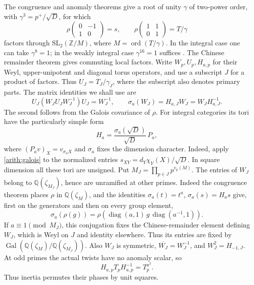 \documentclass[11pt,a4paper]{article}
\numberwithin{equation}{section}
\begin{document}
The congruence and anomaly theorems give a root of unity $\gamma$ of
two-power order, with $\gamma^3=p^+/\sqrt D$, for which
\[
 \rho\!\begin{pmatrix}0&-1\\1&0\end{pmatrix}=s,
 \qquad
 \rho\!\begin{pmatrix}1&1\\0&1\end{pmatrix}=T/\gamma
\]
factors through $\mathrm{SL}_2(\mathbb Z/M)$, where
$M=\operatorname{ord}(T/\gamma)$. In the integral case one can take
$\gamma^8=1$; in the weakly integral case $\gamma^{16}=1$ suffices
\cite[Theorem~II, Proposition~6.7 and Theorem~6.10]{DLNCongruence}.
The Chinese remainder theorem gives commuting local factors. Write
$W_p,U_p,H_{a,p}$ for their Weyl, upper-unipotent and diagonal torus
operators, and use a subscript $J$ for a product of factors. Thus
$U_J=T_J/\gamma_J$, where the subscript also denotes primary parts.
The matrix identities we shall use are
\begin{equation}\label{loc:bruhat}
 U_J(W_JU_JW_J^{-1})U_J=W_J^{-1},\qquad
 \sigma_a(W_J)=H_{a,J}W_J=W_JH_{a,J}^{-1}.
\end{equation}
The second follows from the Galois covariance of $\rho$.
For integral categories its tori have the particularly simple form
\begin{equation}\label{loc:torus}
 H_a=\frac{\sigma_a(\sqrt D)}{\sqrt D}\,P_a,
\end{equation}
where $(P_a v)_X=v_{\sigma_a X}$ and $\sigma_a$ fixes the dimension
character. Indeed, apply \eqref{arith:galois} to the normalized entries
$s_{XY}=d_Y\chi_Y(X)/\sqrt D$. In square dimension all these tori are unsigned.
Put $M_J=\prod_{p\in J}p^{v_p(M)}$. The entries of $W_J$ belong to
$\mathbb Q(\zeta_{M_J})$, hence are unramified at other primes.
Indeed the congruence theorem places $\rho$ in $\mathbb Q(\zeta_M)$,
and the identities $\sigma_a(t)=t^a$, $\sigma_a(s)=H_as$ give,
first on the generators and then on every group element,
\[
 \sigma_a(\rho(g))=
 \rho\!\left(\operatorname{diag}(a,1)\,g\,
                         \operatorname{diag}(a^{-1},1)\right).
\]
If $a\equiv1\pmod{M_J}$, this conjugation fixes the
Chinese-remainder element defining $W_J$, which is Weyl on $J$ and
identity elsewhere. Thus its entries are fixed by
$\operatorname{Gal}(\mathbb Q(\zeta_M)/\mathbb Q(\zeta_{M_J}))$.
Also $W_J$ is symmetric, $\overline{W_J}=W_J^{-1}$, and
$W_J^2=H_{-1,J}$.
At odd primes the actual twists have no anomaly scalar, so
\begin{equation}\label{loc:twist-square}
                 H_{a,p}T_pH_{a,p}^{-1}=T_p^{a^2}.
\end{equation}
Thus inertia permutes their phases by unit squares.
\end{document}
